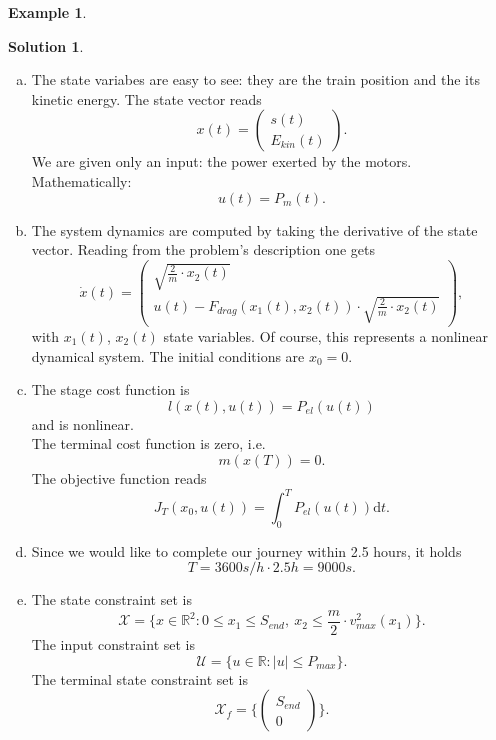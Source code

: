 \documentclass[a4paper,12 pt]{article}
\numberwithin{equation}{section}
\theoremstyle{definition}
\newtheorem{bsp}{Example}
\theoremstyle{remark}
\theoremstyle{definition}
\newtheorem*{lsg}{Solution}
\theoremstyle{definition}
\theoremstyle{definition}
\theoremstyle{remark}
\begin{document}
\begin{bsp}
\newpage
\begin{lsg}
\
\begin{enumerate}[(a)]
\item The state variabes are easy to see: they are the train position and the its kinetic energy. The state vector reads
\begin{equation*}
x(t)=\begin{pmatrix} s(t)\\E_{kin}(t) \end{pmatrix}.
\end{equation*}
We are given only an input: the power exerted by the motors. Mathematically:
\begin{equation*}
u(t)=P_m(t).
\end{equation*}
\item The system dynamics are computed by taking the derivative of the state vector. Reading from the problem's description one gets
\begin{equation*}
\dot{x}(t)=\begin{pmatrix} 
\sqrt{\frac{2}{m}\cdot x_2(t)} \\[6pt]
u(t)-F_{drag}(x_1(t),x_2(t))\cdot \sqrt{\frac{2}{m}\cdot x_2(t)}
\end{pmatrix},
\end{equation*}
with $x_1(t)$, $x_2(t)$ state variables. Of course, this represents a nonlinear dynamical system. The initial conditions are $x_0=0$.
\item The stage cost function is $$l(x(t),u(t))=P_{el}(u(t))$$ and is nonlinear.\\ The terminal cost function is zero, i.e.
\begin{equation*}
m(x(T))=0.
\end{equation*}
The objective function reads
\begin{equation*}
J_T(x_0,u(t))=\int_0^{T}P_{el}(u(t))\text{d}t.
\end{equation*}
\item Since we would like to complete our journey within 2.5 hours, it holds
$$T=3600s/h\cdot 2.5h=9000s.$$
\item The state constraint set is 
\begin{equation*}
\mathcal{X}=\{x\in \mathbb{R}^2: 0\leq x_1\leq S_{end},\ x_2\leq \frac{m}{2}\cdot v^2_{max}(x_1)\}.
\end{equation*}
The input constraint set is
\begin{equation*}
\mathcal{U}=\{u\in \mathbb{R}: |u|\leq P_{max}\}.
\end{equation*}
The terminal state constraint set is
\begin{equation*}
\mathcal{X}_f=\{\begin{pmatrix} S_{end}\\ 0 \end{pmatrix} \}.
\end{equation*}




\end{enumerate}

\end{lsg}

\end{bsp}
\end{document}
